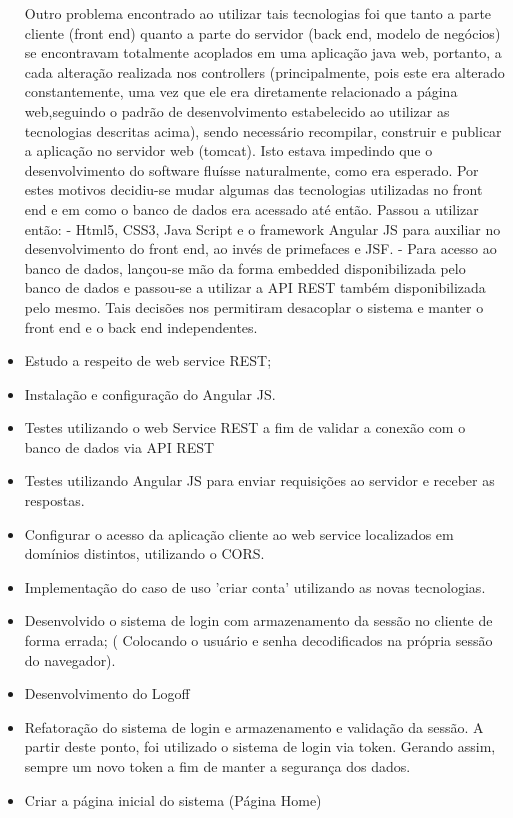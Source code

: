 \begin{itemize}
		Outro problema encontrado ao utilizar tais tecnologias foi que tanto a parte cliente (front end) quanto a parte do servidor (back end, modelo de negócios) se encontravam totalmente acoplados em uma aplicação java web, portanto, a cada alteração realizada nos controllers (principalmente, pois este era alterado constantemente, uma vez que ele era diretamente relacionado a página web,seguindo o padrão de desenvolvimento estabelecido ao utilizar as tecnologias descritas acima), sendo necessário recompilar, construir e publicar a aplicação no servidor web (tomcat). Isto estava impedindo que o desenvolvimento do software fluísse naturalmente, como era esperado. Por estes motivos decidiu-se mudar algumas das tecnologias utilizadas no front end e em como o banco de dados era acessado até então. 
			Passou a utilizar então:
			- Html5, CSS3, Java Script e o framework Angular JS para auxiliar no desenvolvimento do front end, ao invés de primefaces e JSF.
			- Para acesso ao banco de dados, lançou-se mão da forma embedded disponibilizada pelo banco de dados e passou-se a utilizar a API REST também disponibilizada pelo mesmo. Tais decisões nos permitiram desacoplar o sistema e manter o front end e o back end independentes.
		\item Estudo a respeito de web service REST;
		\item Instalação e configuração do Angular JS. 
		\item Testes utilizando o web Service REST a fim de validar a conexão com o banco de dados via API REST 
		\item Testes utilizando Angular JS para enviar requisições ao servidor e receber as respostas. 
		\item Configurar o acesso da aplicação cliente ao web service localizados em domínios distintos, utilizando o CORS. 
		\item Implementação do caso de uso 'criar conta' utilizando as novas tecnologias.
		\item Desenvolvido o sistema de login com armazenamento da sessão no cliente de forma errada; ( Colocando o usuário e senha decodificados na própria sessão do navegador).
		\item Desenvolvimento do Logoff
		\item Refatoração do sistema de login e armazenamento e validação da sessão. A partir deste ponto, foi utilizado o sistema de login via token. Gerando assim, sempre um novo token a fim de manter a segurança dos dados. 
		\item Criar a página inicial do sistema (Página Home)

\end{itemize}
